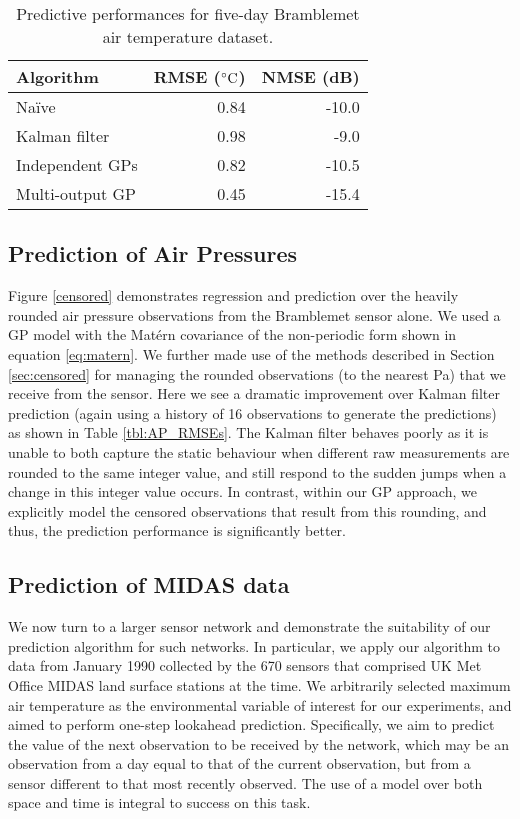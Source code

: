 \documentclass{acmtrans2m}
\begin{document}
\begin{table}
\centering
\caption{Predictive performances for five-day Bramblemet air temperature dataset.}
\label{tbl:AT_RMSEs}
 \begin{tabular}{@{}lrr@{}}
 \\
 \toprule
Algorithm & RMSE ($^\circ\text{C}$) & NMSE (dB)\\
\midrule
Na\"{i}ve & 0.84 & -10.0\\
Kalman filter & 0.98 & -9.0\\
Independent GPs & 0.82 & -10.5 \\
Multi-output GP & 0.45 & -15.4\\
\bottomrule
\end{tabular}
\end{table}

\subsection{Prediction of Air Pressures}

\noindent Figure \ref{censored} demonstrates regression and prediction over the heavily rounded air pressure observations from the Bramblemet sensor alone. We used a GP model with the Mat\'{e}rn covariance of the non-periodic form shown in equation \eqref{eq:matern}. We further made use of the methods described in Section \ref{sec:censored} for managing the rounded observations (to the nearest Pa) that we receive from the sensor. Here we see a dramatic improvement over Kalman filter prediction (again using a history of 16 observations to generate the predictions) as shown in Table \ref{tbl:AP_RMSEs}. The Kalman filter behaves poorly as it is unable to both capture the static behaviour when different raw measurements are rounded to the same integer value, and still respond to the sudden jumps when a change in this integer value occurs. In contrast, within our GP approach, we explicitly model the censored observations that result from this rounding, and thus, the prediction performance is significantly better.

\subsection{Prediction of MIDAS data}

We now turn to a larger sensor network and demonstrate the suitability of our prediction algorithm for such networks. In particular, we apply our algorithm to data from January 1990 collected by the 670 sensors that comprised UK Met Office MIDAS land
surface stations at the time. We arbitrarily selected maximum air temperature as the environmental variable of interest for our experiments, and aimed to perform one-step lookahead prediction. Specifically, we aim to predict the value of the next observation to be received by the network, which may be an observation from a day equal to that of the current observation, but from a sensor different to that most recently observed. The use of a model over both space and time is integral to success on this task.
\end{document}

